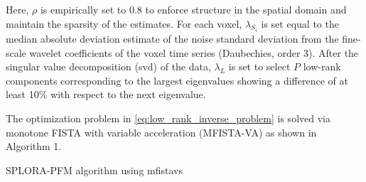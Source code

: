 Here, $\rho$ is empirically set to 0.8 to enforce structure in the spatial
domain and maintain the sparsity of the estimates. For each voxel,
$\lambda_{S_i}$ is set equal to the median absolute deviation estimate  of the
noise standard deviation from the fine-scale wavelet coefficients of the voxel
time series (Daubechies, order 3). After the singular value decomposition
(\acrshort*{svd}) of the data, $\lambda_L$ is set to select $P$ low-rank
components corresponding to the largest eigenvalues showing a difference of at
least 10\% with respect to the next eigenvalue. 

The optimization problem in \cref{eq:low_rank_inverse_problem} is solved via
monotone FISTA with variable acceleration (MFISTA-VA)
\citep{Zibetti2018MonotoneFISTAvariable} as shown in Algorithm 1.

\begin{algorithm}[tb]
    \label{alg:1}
    \caption{SPLORA-PFM algorithm using \acrshort*{mfistavs}}
\end{algorithm}
